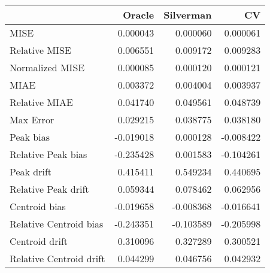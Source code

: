 \begin{tabular}{lrrr}
  \hline
 & Oracle & Silverman & CV \\ 
  \hline
MISE & 0.000043 & 0.000060 & 0.000061 \\ 
  Relative MISE & 0.006551 & 0.009172 & 0.009283 \\ 
  Normalized MISE & 0.000085 & 0.000120 & 0.000121 \\ 
  MIAE & 0.003372 & 0.004004 & 0.003937 \\ 
  Relative MIAE & 0.041740 & 0.049561 & 0.048739 \\ 
  Max Error & 0.029215 & 0.038775 & 0.038180 \\ 
  Peak bias & -0.019018 & 0.000128 & -0.008422 \\ 
  Relative Peak bias & -0.235428 & 0.001583 & -0.104261 \\ 
  Peak drift & 0.415411 & 0.549234 & 0.440695 \\ 
  Relative Peak drift & 0.059344 & 0.078462 & 0.062956 \\ 
  Centroid bias & -0.019658 & -0.008368 & -0.016641 \\ 
  Relative Centroid bias & -0.243351 & -0.103589 & -0.205998 \\ 
  Centroid drift & 0.310096 & 0.327289 & 0.300521 \\ 
  Relative Centroid drift & 0.044299 & 0.046756 & 0.042932 \\ 
   \hline
\end{tabular}
